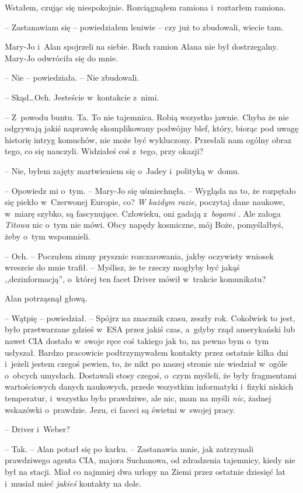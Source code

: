 \documentclass[oneside,polish,12pt,sfheadings]{mwbk}
\begin{document}
Wstałem, czując się niespokojnie. Rozciągnąłem ramiona i~roztarłem
ramiona. 

-- Zastanawiam się -- powiedziałem leniwie -- czy już to
zbudowali, wiecie tam.

Mary-Jo i~Alan spojrzeli na siebie. Ruch ramion Alana nie był
dostrzegalny. Mary-Jo odwróciła się do mnie.

-- Nie -- powiedziała. -- Nie zbudowali.

-- Skąd\ldots Och. Jesteście w~kontakcie z~nimi.

-- Z~powodu buntu. Ta. To nie tajemnica. Robią wszystko jawnie. Chyba że
nie odgrywają jakiś naprawdę skomplikowany podwójny blef, który, biorąc
pod uwagę historię intryg komuchów, nie może być wykluczony. Przesłali
nam ogólny obraz tego, co się nauczyli. Widziałeś coś z~tego, przy
okazji?

-- Nie, byłem zajęty martwieniem się o~Jadey i~polityką w~domu.

-- Opowiedz mi o~tym. -- Mary-Jo się uśmiechnęła. -- Wygląda na to, że
rozpętało się piekło w~Czerwonej Europie, co? \emph{W każdym razie},
poczytaj dane naukowe, w~miarę szybko, są fascynujące. Człowieku, oni
gadają z~\emph{bogami }. Ale załoga \emph{Titowa} nic o~tym nie mówi.
Obcy napędy kosmiczne, mój Boże, pomyślałbyś, żeby o~tym wspomnieli.

-- Och. -- Poczułem zimny prysznic rozczarowania, jakby oczywisty wniosek
wreszcie do mnie trafił. -- Myślisz, że te rzeczy mogłyby być jakąś
,,dezinformacją'', o~której ten facet Driver mówił w~trakcie komunikatu?

Alan potrząsnął głową. 

-- Wątpię -- powiedział. -- Spójrz na znacznik
czasu, zeszły rok. Cokolwiek to jest, było przetwarzane gdzieś w~ESA
przez jakiś czas, a~gdyby rząd amerykański lub nawet CIA dostało w~swoje
ręce coś takiego jak to, na pewno bym o~tym usłyszał. Bardzo pracowicie
podtrzymywałem kontakty przez ostatnie kilka dni i~jeżeli jestem czegoś
pewien, to, że nikt po naszej stronie nie wiedział w~ogóle o~obcych
umysłach. Dostawali stosy czegoś, o~czym myśleli, że były fragmentami
wartościowych danych naukowych, przede wszystkim informatyki i~fizyki
niskich temperatur, i~wszystko było prawdziwe, ale nic, mam na myśli
\emph{nic}, żadnej wskazówki o~prawdzie. Jezu, ci faceci są świetni w~swojej pracy.

-- Driver i~Weber?

-- Tak. -- Alan potarł się po karku. -- Zastanawia mnie, jak zatrzymali
prawdziwego agenta CIA, majora Suchanowa, od zdradzenia tajemnicy, kiedy
nie był na stacji. Miał co najmniej dwa urlopy na Ziemi przez ostatnie
dziesięć lat i~musiał mieć \emph{jakieś} kontakty na dole.
\end{document}
